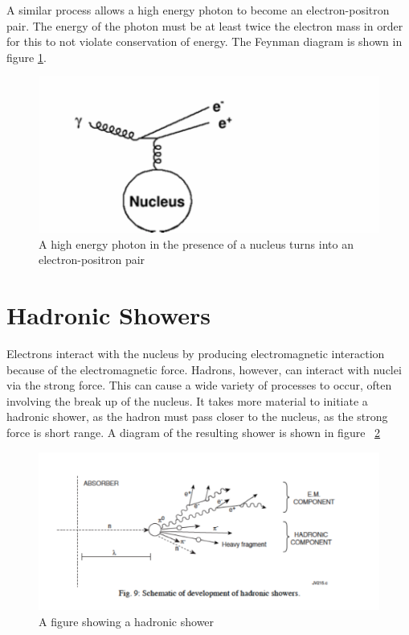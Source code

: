 \;


\noindent
A similar process allows a high energy photon to become an electron-positron pair.  The energy of the photon must be at least twice the electron mass in order for this to not violate conservation of energy.  The Feynman diagram is shown in figure \ref{fig:cal3}.


\;
\;

\begin{figure}[h]
\centering\includegraphics[scale=0.7]{./calorimetry/Pictures/fig3.pdf}
\caption{A high energy photon in the presence of a nucleus turns into an electron-positron pair}
\label{fig:cal3}
\end{figure}

\;

\section{Hadronic Showers}

\noindent
Electrons interact with the nucleus by producing electromagnetic interaction because of the electromagnetic force. Hadrons, however, can interact with nuclei via the strong force. This can cause a wide variety of processes to occur, often involving the break up of the nucleus. It takes more material to initiate a hadronic shower, as the hadron must pass closer to the nucleus, as the strong force is short range. A diagram of the resulting shower is shown in figure ~\ref{fig:cal4}

\;
\;

\begin{figure}[h]
\centering\includegraphics[scale=0.5]{./calorimetry/Pictures/fig4.pdf}
\caption{A figure showing a hadronic shower}
\label{fig:cal4}
\end{figure}

